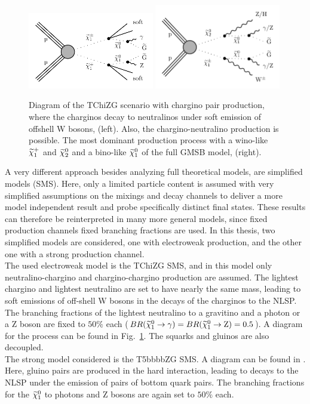 \begin{figure}[hbtp]
 \centering
 \includegraphics[width=0.49\textwidth]{figures/signal/TChiNG}
 \includegraphics[width=0.49\textwidth]{figures/signal/gmsb}
 \caption{Diagram of the TChiZG scenario with chargino pair production, where the charginos decay to neutralinos under soft emission of offshell W bosons, (left). Also, the chargino-neutralino production is possible. The most dominant production process with a wino-like $\widetilde{\chi}^{+}_{1}$ and $\widetilde{\chi}^{0}_{2}$ and a bino-like $\widetilde{\chi}^{0}_{1}$ of the full GMSB model, (right).}
 \label{fig:ewkSMS}
\end{figure}

A very different approach besides analyzing full theoretical models, are simplified models (SMS)\cite{REF}. Here, only a limited particle content is assumed with very simplified assumptions on the mixings and decay channels to deliver a more model independent result and probe specifically distinct final states. These results can therefore be reinterpreted in many more general models, since fixed production channels fixed branching fractions are used. In this thesis, two simplified models are considered, one with electroweak production, and the other one with a strong production channel.\\
The used electroweak model is the TChiZG SMS, and in this model only neutralino-chargino and chargino-chargino production are assumed. The lightest chargino and lightest neutralino are set to have nearly the same mass, leading to soft emissions of off-shell W bosons in the decays of the charginos to the NLSP. The branching fractions of the lightest neutralino to a gravitino and a photon or a Z boson are fixed to $50\%$ each ($BR(\widetilde{\chi}^{0}_{1}\to\gamma)=BR(\widetilde{\chi}^{0}_{1}\to\mathrm{Z})=0.5$). A diagram for the process can be found in Fig.~\ref{fig:ewkSMS}. The squarks and gluinos are also decoupled.\\
The strong model considered is the T5bbbbZG SMS. A diagram can be found in . Here, gluino pairs are produced in the hard interaction, leading to decays to the NLSP under the emission of pairs of bottom quark pairs. The branching fractions for the $\widetilde{\chi}^{0}_{1}$ to photons and Z bosons are again set to $50\%$ each.

